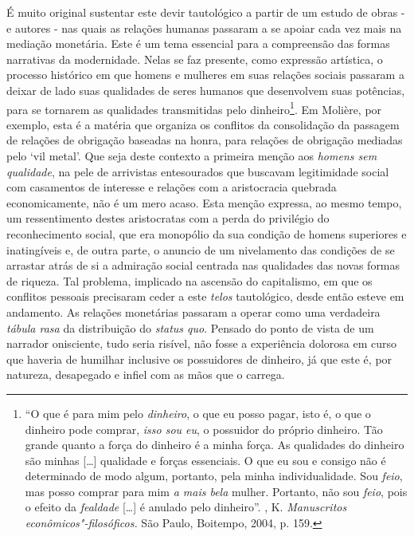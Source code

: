 {É muito original sustentar este devir tautológico a partir de um estudo
de obras - e autores - nas quais as relações humanas passaram a se
apoiar cada vez mais na mediação monetária. Este é um tema essencial
para a compreensão das formas narrativas da modernidade. Nelas se faz
presente, como expressão artística, o processo histórico em que homens e
mulheres em suas relações sociais passaram a deixar de lado suas
qualidades de seres humanos que desenvolvem suas potências, para se
tornarem as qualidades transmitidas pelo dinheiro\footnote{``O que é
  para mim pelo \emph{dinheiro}, o que eu posso pagar, isto é, o que o
  dinheiro pode comprar, \emph{isso sou eu}, o possuidor do próprio
  dinheiro. Tão grande quanto a força do dinheiro é a minha força. As
  qualidades do dinheiro são minhas [\ldots{}] qualidade e forças
  essenciais. O que eu sou e consigo não é determinado de modo algum,
  portanto, pela minha individualidade. Sou \emph{feio}, mas posso
  comprar para mim \emph{a mais bela} mulher. Portanto, não sou
  \emph{feio}, pois o efeito da \emph{fealdade} [\ldots{}] é anulado
  pelo dinheiro''. , K. \emph{\emph{Manuscritos
  econômicos"-filosóficos}.} São Paulo, Boitempo, 2004, p. 159.}. Em
Molière, por exemplo, esta é a matéria que organiza os conflitos da
consolidação da passagem de relações de obrigação baseadas na honra,
para relações de obrigação mediadas pelo `vil metal'. Que seja deste
contexto a primeira menção aos \emph{homens sem qualidade}, na pele de
arrivistas entesourados que buscavam legitimidade social com casamentos
de interesse e relações com a aristocracia quebrada economicamente, não
é um mero acaso. Esta menção expressa, ao mesmo tempo, um ressentimento
destes aristocratas com a perda do privilégio do reconhecimento social,
que era monopólio da sua condição de homens superiores e inatingíveis e,
de outra parte, o anuncio de um nivelamento das condições de se arrastar
atrás de si a admiração social centrada nas qualidades das novas formas
de riqueza. Tal problema, implicado na ascensão do capitalismo, em que
os conflitos pessoais precisaram ceder a este \emph{telos} tautológico,
desde então esteve em andamento. As relações monetárias passaram a
operar como uma verdadeira \emph{tábula rasa} da distribuição do
\emph{status quo}. Pensado do ponto de vista de um narrador onisciente,
tudo seria risível, não fosse a experiência dolorosa em curso que
haveria de humilhar inclusive os possuidores de dinheiro, já que este é,
por natureza, desapegado e infiel com as mãos que o carrega.

}
